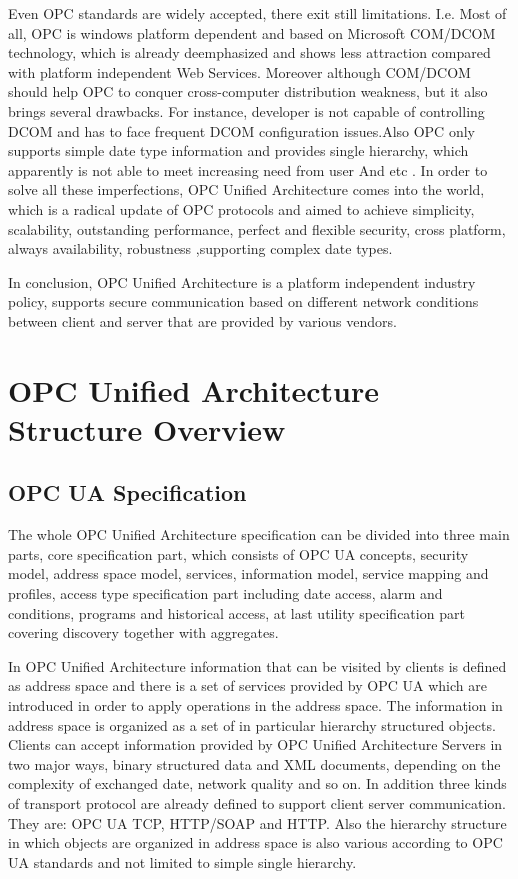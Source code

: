 \documentclass[]{llncs}
\begin{document}
Even OPC standards are widely accepted, there exit still limitations. I.e. Most of all, OPC is windows platform dependent and based on Microsoft COM/DCOM technology, which is already deemphasized and shows less attraction compared with platform independent Web Services. Moreover although COM/DCOM should help OPC to conquer cross-computer distribution weakness, but it also brings several drawbacks. For instance, developer is not capable of controlling DCOM and has to face frequent DCOM configuration issues\cite{Ref4}.Also OPC only supports simple date type information and provides single hierarchy, which apparently is not able to meet increasing need from user And etc \cite{Ref2}.
In order to solve all these imperfections, OPC Unified Architecture comes into the world, which is a radical update of OPC protocols and aimed to achieve simplicity, scalability, outstanding performance, perfect and flexible security, cross platform, always availability, robustness ,supporting complex date types.


In conclusion, OPC Unified Architecture is a platform independent industry policy, supports secure communication based on different network conditions between client and server that are provided by various vendors. 





\section{OPC Unified Architecture Structure Overview }

\subsection{OPC UA Specification}

The whole OPC Unified Architecture specification can be divided into three main parts, core specification part, which consists of OPC UA concepts, security model, address space model, services, information model, service mapping and profiles, access type specification part including date access, alarm and conditions, programs and historical access, at last utility specification part covering discovery together with aggregates. 


In OPC Unified Architecture information that can be visited by clients is defined as address space\cite{O3} and there is a set of services\cite{O4} provided by OPC UA which are introduced in order to apply operations in the address space. The information in address space is organized as a set of in particular hierarchy structured objects. Clients can accept information provided by OPC Unified Architecture Servers in two major ways, binary structured data and XML documents, depending on the complexity of exchanged date, network quality and so on. In addition three kinds of transport protocol are already defined to support client server communication. They are: OPC UA TCP, HTTP/SOAP and HTTP. Also the hierarchy structure in which objects are organized in address space is also various according to OPC UA standards and not limited to simple single hierarchy.   
\end{document}

